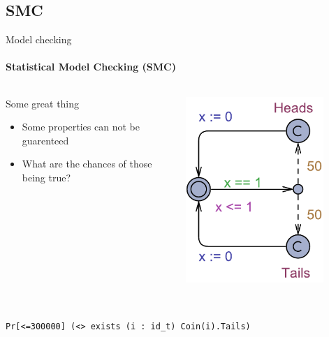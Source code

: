 \subsection{SMC}
\begin{frame}[t]{Model checking}
	\framesubtitle{Statistical Model Checking (SMC)}
	
	\begin{columns}[T]
		\begin{column}{.48\textwidth}
			Some great thing
			
			\begin{itemize}
				\item<+-> Some properties can not be guarenteed
				\item<+-> What are the chances of those being true?
			\end{itemize}
		\end{column}
		\begin{column}{.48\textwidth}
			\includegraphics[trim=0 200 0 200,width=0.8\textwidth]{images/Simple_SMC.pdf}
		\end{column}
	\end{columns}
	\\[3cm]
	\texttt{Pr[<=300000] (<> exists (i : id\_t) Coin(i).Tails)}
\end{frame}